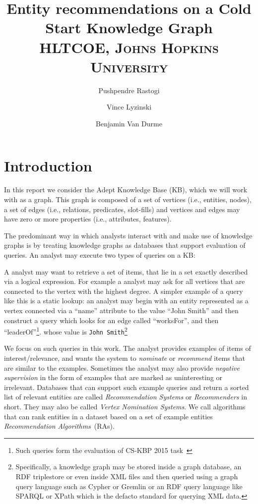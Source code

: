 \documentclass[paper=a4,fontsize=11pt]{scrartcl}
\title{
  \vspace{-1in}
  {\normalfont\huge Entity recommendations on a Cold Start Knowledge Graph}\\
  {\normalfont\normalsize\textsc{HLTCOE, Johns Hopkins University}}\\
}
\author{{\normalfont\normalsize Pushpendre Rastogi}
  \and
  {\normalfont\normalsize Vince Lyzinski}
  \and
  {\normalfont\normalsize Benjamin Van Durme}\\
}
\date{}
\newcommand{\ie}{i.e.,\xspace}
\numberwithin{equation}{section}    %
\numberwithin{figure}{section}      %
\numberwithin{table}{section}       %
\newcommand{\task}{CS-KBP 2015 task\ }
\begin{document}
\maketitle
\section{Introduction}
\label{sec:introduction}
In this report we consider the Adept Knowledge Base (KB), which we
will work with as a graph. This graph is composed of a set of
vertices (\ie entities, nodes), a set of edges (\ie relations,
predicates, slot-fills) and vertices and edges may have zero or more
properties (\ie attributes, features).

The predominant way in which analysts interact with and make use of knowledge
graphs is by treating knowledge graphs as databases that support evaluation
of queries. An analyst may execute two types of queries on a KB:
\begin{description}[leftmargin=*]
\item[Logical Queries] A analyst may want to retrieve a set of items,
  that lie in a set exactly described via a logical expression. For example a analyst
may ask for all vertices that are connected to the vertex with the highest
degree. A simpler example of a query like this is a static lookup: an
analyst may begin with an entity represented as a vertex connected via a
``name'' attribute to the value ``John Smith'' and then construct a query which
looks for an edge called ``worksFor'', and then ``leaderOf''\footnote{Such
  queries form the evaluation of \task}.
whose value is \texttt{John Smith}\footnote
{Specifically, a knowledge graph may be stored inside a graph database,
an RDF {triplestore} or even inside XML files and then queried using a graph
query language such as Cypher or Gremlin or an RDF query language like SPARQL
or XPath which is the defacto standard for querying XML data.}
\item[Example Queries] We focus on such queries in this work.
  The analyst provides {examples} of items of
  interest/relevance, and wants the system to \textit{nominate} or \textit{recommend}
  items that are similar to the examples. Sometimes the analyst may also
  provide \textit{negative supervision} in the form of examples that are marked
  as uninteresting or irrelevant. Databases that can support such
  example queries and return a sorted list of relevant entities are called
  \textit{Recommendation Systems} or \textit{Recommenders} in short. They may
  also be called \textit{Vertex Nomination Systems}. We call algorithms
that can rank entities in a dataset based on a set of example entities
\textit{Recommendation Algorithms}~(RAs).
\end{description}
\end{document}
